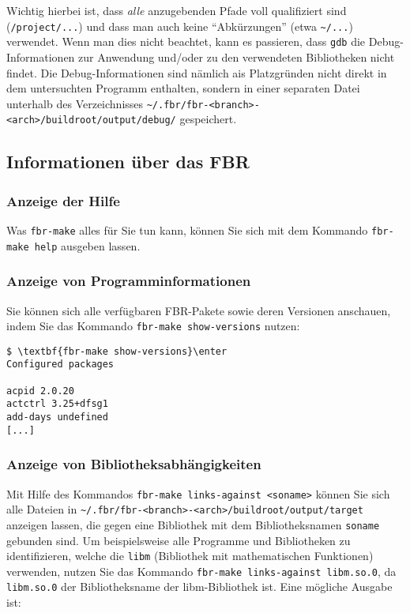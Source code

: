 Wichtig hierbei ist, dass \emph{alle} anzugebenden Pfade voll qualifiziert sind
(\texttt{/project/...}) und dass man auch keine ``Abkürzungen'' (etwa
\texttt{\~{}/...}) verwendet. Wenn man dies nicht beachtet, kann es passieren,
dass \texttt{gdb} die Debug-Informationen zur Anwendung und/oder zu den
verwendeten Bibliotheken nicht findet. Die Debug-Informationen sind nämlich
ais Platzgründen nicht direkt in dem untersuchten Programm enthalten, sondern in
einer separaten Datei unterhalb des Verzeichnisses
\texttt{\~{}/.fbr/fbr-<branch>-<arch>/buildroot/output/debug/} gespeichert.

\subsection{Informationen über das FBR}

\subsubsection{Anzeige der Hilfe}

Was \texttt{fbr-make} alles für Sie tun kann, können Sie sich mit dem Kommando
\texttt{fbr-make help} ausgeben lassen.

\subsubsection{Anzeige von Programminformationen}

Sie können sich alle verfügbaren FBR-Pakete sowie deren Versionen anschauen,
indem Sie das Kommando \texttt{fbr-make show-versions} nutzen:

\begin{example}
\begin{Verbatim}[commandchars=\\\{\}]
$ \textbf{fbr-make show-versions}\enter
Configured packages

acpid 2.0.20
actctrl 3.25+dfsg1
add-days undefined
[...]
\end{Verbatim}
\end{example}

\subsubsection{Anzeige von Bibliotheksabhängigkeiten}

Mit Hilfe des Kommandos \texttt{fbr-make links-against <soname>} können Sie sich
alle Dateien in \texttt{\~{}/.fbr/fbr-<branch>-<arch>/buildroot/output/target}
anzeigen lassen, die gegen eine Bibliothek mit dem Bibliotheksnamen
\texttt{soname} gebunden sind. Um beispielsweise alle Programme und Bibliotheken
zu identifizieren, welche die \texttt{libm} (Bibliothek mit mathematischen
Funktionen) verwenden, nutzen Sie das Kommando \texttt{fbr-make links-against
libm.so.0}, da \texttt{libm.so.0} der Bibliotheksname der libm-Bibliothek ist.
Eine mögliche Ausgabe ist:

